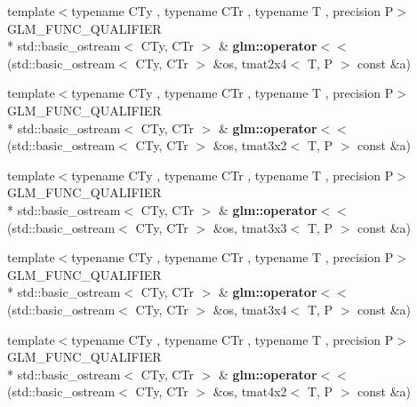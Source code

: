 \begin{DoxyCompactItemize}
\item 
\hypertarget{group__gtx__io_ga1a2314cab31da0e736bc5e601bcb8f37}{{\footnotesize template$<$typename C\-Ty , typename C\-Tr , typename T , precision P$>$ }\\G\-L\-M\-\_\-\-F\-U\-N\-C\-\_\-\-Q\-U\-A\-L\-I\-F\-I\-E\-R \\*
std\-::basic\-\_\-ostream$<$ C\-Ty, C\-Tr $>$ \& {\bfseries glm\-::operator$<$$<$} (std\-::basic\-\_\-ostream$<$ C\-Ty, C\-Tr $>$ \&os, tmat2x4$<$ T, P $>$ const \&a)}\label{group__gtx__io_ga1a2314cab31da0e736bc5e601bcb8f37}

\item 
\hypertarget{group__gtx__io_gac825ec168ada9209dad314bca460ceef}{{\footnotesize template$<$typename C\-Ty , typename C\-Tr , typename T , precision P$>$ }\\G\-L\-M\-\_\-\-F\-U\-N\-C\-\_\-\-Q\-U\-A\-L\-I\-F\-I\-E\-R \\*
std\-::basic\-\_\-ostream$<$ C\-Ty, C\-Tr $>$ \& {\bfseries glm\-::operator$<$$<$} (std\-::basic\-\_\-ostream$<$ C\-Ty, C\-Tr $>$ \&os, tmat3x2$<$ T, P $>$ const \&a)}\label{group__gtx__io_gac825ec168ada9209dad314bca460ceef}

\item 
\hypertarget{group__gtx__io_ga3ea3ca90bea2e763079f09af1e5d50ab}{{\footnotesize template$<$typename C\-Ty , typename C\-Tr , typename T , precision P$>$ }\\G\-L\-M\-\_\-\-F\-U\-N\-C\-\_\-\-Q\-U\-A\-L\-I\-F\-I\-E\-R \\*
std\-::basic\-\_\-ostream$<$ C\-Ty, C\-Tr $>$ \& {\bfseries glm\-::operator$<$$<$} (std\-::basic\-\_\-ostream$<$ C\-Ty, C\-Tr $>$ \&os, tmat3x3$<$ T, P $>$ const \&a)}\label{group__gtx__io_ga3ea3ca90bea2e763079f09af1e5d50ab}

\item 
\hypertarget{group__gtx__io_ga5a5ca6f99c027a2277b24de487198fe0}{{\footnotesize template$<$typename C\-Ty , typename C\-Tr , typename T , precision P$>$ }\\G\-L\-M\-\_\-\-F\-U\-N\-C\-\_\-\-Q\-U\-A\-L\-I\-F\-I\-E\-R \\*
std\-::basic\-\_\-ostream$<$ C\-Ty, C\-Tr $>$ \& {\bfseries glm\-::operator$<$$<$} (std\-::basic\-\_\-ostream$<$ C\-Ty, C\-Tr $>$ \&os, tmat3x4$<$ T, P $>$ const \&a)}\label{group__gtx__io_ga5a5ca6f99c027a2277b24de487198fe0}

\item 
\hypertarget{group__gtx__io_ga8ce3cf61260e62080a9596c2f10ab4a0}{{\footnotesize template$<$typename C\-Ty , typename C\-Tr , typename T , precision P$>$ }\\G\-L\-M\-\_\-\-F\-U\-N\-C\-\_\-\-Q\-U\-A\-L\-I\-F\-I\-E\-R \\*
std\-::basic\-\_\-ostream$<$ C\-Ty, C\-Tr $>$ \& {\bfseries glm\-::operator$<$$<$} (std\-::basic\-\_\-ostream$<$ C\-Ty, C\-Tr $>$ \&os, tmat4x2$<$ T, P $>$ const \&a)}\label{group__gtx__io_ga8ce3cf61260e62080a9596c2f10ab4a0}


\end{DoxyCompactItemize}

